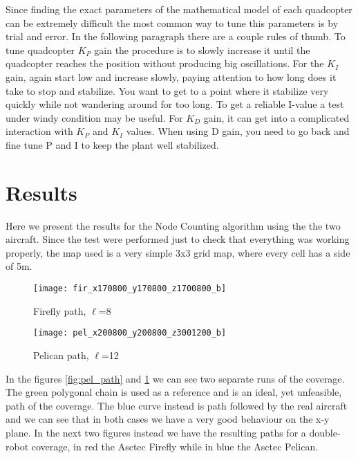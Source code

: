 Since finding the exact parameters of the mathematical model of each quadcopter can be extremely difficult the most common way to tune this parameters is by trial and error. In the following paragraph there are a couple rules of thumb. To tune quadcopter $K_P$ gain the procedure is to slowly increase it until the quadcopter reaches the position without producing big oscillations. For the $K_I$ gain, again start low and increase slowly, paying attention to how long does it take to stop and stabilize. You want to get to a point where it stabilize very quickly while not wandering around for too long. To get a reliable I-value a test under windy condition may be useful. For $K_D$ gain, it can get into a complicated interaction with $K_P$ and $K_I$ values. When using D gain, you need to go back and fine tune P and I to keep the plant well stabilized.

\section{Results}

Here we present the results for the Node Counting algorithm using the the two aircraft. Since the test were performed just to check that everything was working properly, the map used is a very simple 3x3 grid map, where every cell has a side of 5m.

\begin{figure}[H] 
  \begin{minipage}[b]{0.5\linewidth}
    \centering
    \texttt{[image: fir\_x170800\_y170800\_z1700800\_b]}
    \caption{Firefly path, $\ell$=8}
    \label{fig:pel_path}
  \end{minipage}
  \begin{minipage}[b]{0.5\linewidth}
    \centering
    \texttt{[image: pel\_x200800\_y200800\_z3001200\_b]}
    \caption{Pelican path, $\ell$=12}
    \label{fig:fir_path}
  \end{minipage}
\end{figure}

In the figures \ref{fig:pel_path} and \ref{fig:fir_path} we can see two separate runs of the coverage. The green polygonal chain is used as a reference and is an ideal, yet unfeasible, path of the coverage. The blue curve instead is path followed by the real aircraft and we can see that in both cases we have a very good behaviour on the x-y plane.
In the next two figures instead we have the resulting paths for a double-robot coverage, in red the Asctec Firefly while in blue the Asctec Pelican. \\

